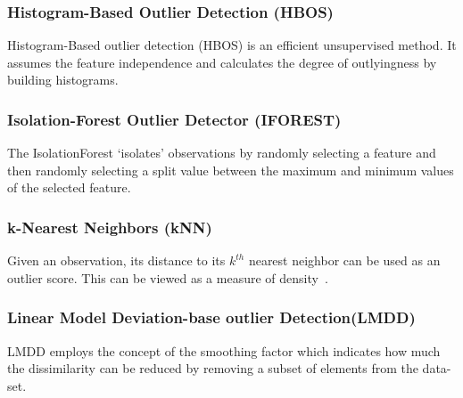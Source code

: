 \subsubsection{Histogram-Based Outlier Detection (HBOS)}
\label{subsubsec:introduction:related-works:hbos}
Histogram-Based outlier detection (HBOS) is an efficient unsupervised method.
It assumes the feature independence and calculates the degree of outlyingness by building histograms\cite{goldstein2012hbos}.

\subsubsection{Isolation-Forest Outlier Detector (IFOREST)}
\label{subsubsec:introduction:related-works:iforest}
The IsolationForest ‘isolates’ observations by randomly selecting a feature and then randomly selecting a split value between the maximum and minimum values of the selected feature\cite{tony2008iforest,tony2012iforest}.

\subsubsection{k-Nearest Neighbors (kNN)}
\label{subsubsec:introduction:related-works:knn}
Given an observation, its distance to its $k^{th}$ nearest neighbor can be used as an outlier score. This can be viewed as a measure of density~\cite{ramaswamy2000efficient, sridhar2000knn, fabrizio2002knn}.

\subsubsection{Linear Model Deviation-base outlier Detection(LMDD)}
\label{subsubsec:introduction:related-works:lmdd}
LMDD employs the concept of the smoothing factor which indicates how much the dissimilarity can be reduced by removing a subset of elements from the data-set\cite{arning1996lmdd}.

